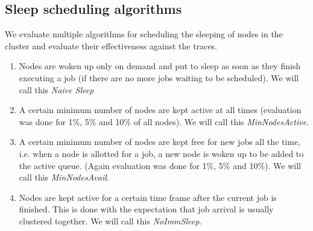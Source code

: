 \subsection{Sleep scheduling algorithms} %
\label{ssub:overhead_induced_by_cc}
We evaluate multiple algorithms for scheduling the sleeping of nodes in the cluster and evaluate their effectiveness against the traces. 
\begin{enumerate}
    \item Nodes are woken up only on demand and put to sleep as soon as they finish executing a job (if there are no more jobs waiting to be scheduled). We will call this {\em Naive Sleep}
    \item A certain minimum number of nodes are kept active at all times (evaluation was done for 1\%, 5\% and 10\% of all nodes). We will call this {\em MinNodesActive}.
    \item A certain minimum number of nodes are kept free for new jobs all the time, i.e. when a node is allotted for a job, a new node is woken up to be added to the active queue. (Again evaluation was done for 1\%, 5\% and 10\%). We will call this {\em MinNodesAvail}.
    \item Nodes are kept active for a certain time frame after the current job is finished. This is done with the expectation that job arrival is usually clustered together. We will call this {\em NoImmSleep}.
\end{enumerate}



